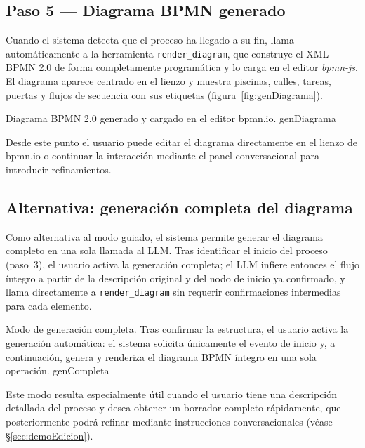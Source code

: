 \subsection{Paso 5 --- Diagrama BPMN generado}
\label{subsec:demoDiagrama}

Cuando el sistema detecta que el proceso ha llegado a su fin, llama automáticamente a la herramienta \texttt{render\_diagram}, que construye el XML BPMN 2.0 de forma completamente programática y lo carga en el editor \textit{bpmn-js}. El diagrama aparece centrado en el lienzo y muestra piscinas, calles, tareas, puertas y flujos de secuencia con sus etiquetas (figura~\ref{fig:genDiagrama}).

%
  {Diagrama BPMN 2.0 generado y cargado en el editor bpmn.io.}%
  {genDiagrama}

Desde este punto el usuario puede editar el diagrama directamente en el lienzo de bpmn.io o continuar la interacción mediante el panel conversacional para introducir refinamientos.

\subsection{Alternativa: generación completa del diagrama}
\label{subsec:demoGeneracionCompleta}

Como alternativa al modo guiado, el sistema permite generar el diagrama completo en una sola llamada al LLM. Tras identificar el inicio del proceso (paso~3), el usuario activa la generación completa; el LLM infiere entonces el flujo íntegro a partir de la descripción original y del nodo de inicio ya confirmado, y llama directamente a \texttt{render\_diagram} sin requerir confirmaciones intermedias para cada elemento.



%
  {Modo de generación completa. Tras confirmar la estructura, el usuario activa la generación automática: el sistema solicita únicamente el evento de inicio y, a continuación, genera y renderiza el diagrama BPMN íntegro en una sola operación.}%
  {genCompleta}

Este modo resulta especialmente útil cuando el usuario tiene una descripción detallada del proceso y desea obtener un borrador completo rápidamente, que posteriormente podrá refinar mediante instrucciones conversacionales (véase \S\ref{sec:demoEdicion}).

